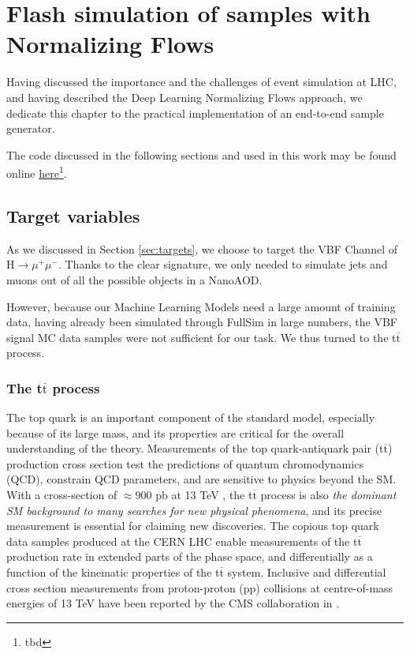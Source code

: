 \chapter{Flash simulation of samples with Normalizing Flows}\label{ch:fs} %

Having discussed the importance and the challenges of event simulation at LHC, and having described the Deep Learning Normalizing Flows approach, we dedicate this chapter to the practical implementation of an end-to-end sample generator.

The code discussed in the following sections and used in this work may be found online \href{tbd}{here}\footnote{tbd}.

\section{Target variables}

As we discussed in Section \ref{sec:targets}, we choose to target the VBF Channel of H$\rightarrow\mu^+\mu^-$. Thanks to the clear signature, we only needed to simulate jets and muons out of all the possible objects in a NanoAOD. 

However, because our Machine Learning Models need a large amount of training data, having already been simulated through FullSim in large numbers, the VBF signal MC data samples were not sufficient for our task. We thus turned to the t$\overline{\text{t}}$ process.

\subsection{The t$\overline{\text{t}}$ process}
The top quark is an important component of the standard model, especially because of
its large mass, and its properties are critical for the overall understanding of the theory. Measurements of the top quark-antiquark pair (t$\overline{\text{t}}$) production cross section test the predictions of
quantum chromodynamics (QCD), constrain QCD parameters, and are sensitive to physics beyond the SM. With a cross-section of $\approx 900$ pb at 13 TeV , the t$\overline{\text{t}}$ process is also \emph{the dominant SM background to many searches for new
physical phenomena}, and its precise measurement is essential for claiming new discoveries.
The copious top quark data samples produced at the CERN LHC enable measurements of the t$\overline{\text{t}}$
production rate in extended parts of the phase space, and differentially as a function of the kinematic properties of the t$\overline{\text{t}}$ system. Inclusive and differential cross section measurements from
proton-proton (pp) collisions at centre-of-mass energies of 13 TeV have been reported by
the CMS collaboration in \cite{Sirunyan_2017}.

